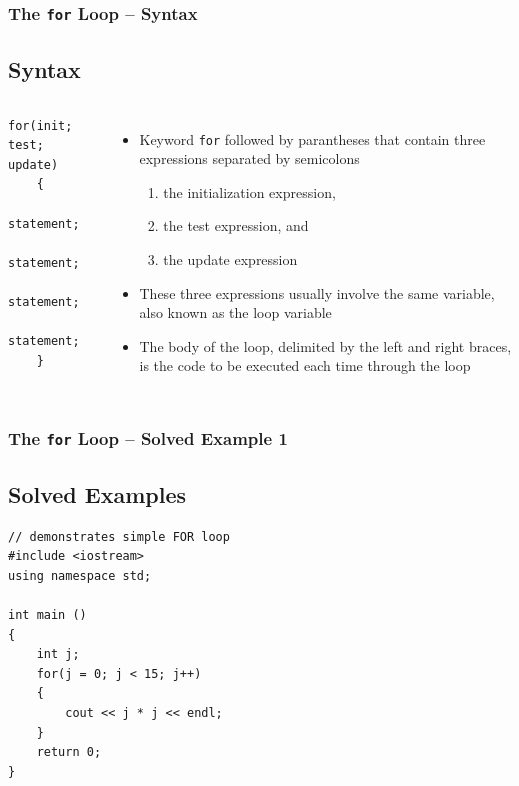 \documentclass{beamer}
\begin{document}
\begin{frame}[fragile]
    \frametitle{The \texttt{for} Loop -- Syntax}
    \subsection{Syntax} %
    \begin{columns}
        \lstset{style=mystyle}
\begin{lstlisting}
for(init; test; update)
    {
       statement;
       statement;
       statement;
       statement;
    }
\end{lstlisting}
            \begin{itemize}
            \item Keyword \texttt{for} followed by parantheses that contain three expressions separated by semicolons
            \begin{enumerate}
                \item the initialization expression,
                \item the test expression, and
                \item the update expression
            \end{enumerate}
            \item These three expressions usually involve the same variable, also known as the loop variable
            \item The body of the loop, delimited by the left and right braces, is the code to be executed each time through the loop
            \end{itemize}
    \end{columns}
\end{frame}

\begin{frame} [fragile]
    \frametitle{The \texttt{for} Loop -- Solved Example 1}
    \subsection{Solved Examples} %
    \lstset{style=mystyle}
    \begin{lstlisting}
// demonstrates simple FOR loop
#include <iostream>
using namespace std;

int main ()
{
    int j;
    for(j = 0; j < 15; j++)
    {
        cout << j * j << endl;
    }
    return 0;
}
\end{lstlisting}
\end{frame}
\end{document}

